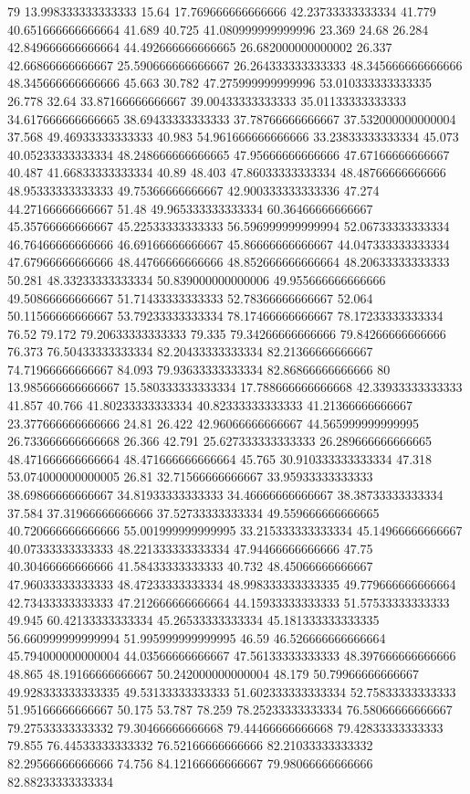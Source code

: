 79 13.998333333333333 15.64 17.769666666666666 42.23733333333334 41.779 40.651666666666664 41.689 40.725 41.080999999999996 23.369 24.68 26.284 42.849666666666664 44.492666666666665 26.682000000000002 26.337 42.66866666666667 25.590666666666667 26.264333333333333 48.345666666666666 48.345666666666666 45.663 30.782 47.275999999999996 53.010333333333335 26.778 32.64 33.87166666666667 39.00433333333333 35.01133333333333 34.617666666666665 38.69433333333333 37.78766666666667 37.532000000000004 37.568 49.46933333333333 40.983 54.961666666666666 33.23833333333334 45.073 40.05233333333334 48.248666666666665 47.95666666666666 47.67166666666667 40.487 41.66833333333334 40.89 48.403 47.86033333333334 48.48766666666666 48.95333333333333 49.75366666666667 42.900333333333336 47.274 44.27166666666667 51.48 49.965333333333334 60.36466666666667 45.35766666666667 45.22533333333333 56.596999999999994 52.06733333333334 46.76466666666666 46.69166666666667 45.86666666666667 44.047333333333334 47.67966666666666 48.44766666666666 48.852666666666664 48.20633333333333 50.281 48.33233333333334 50.839000000000006 49.955666666666666 49.50866666666667 51.71433333333333 52.78366666666667 52.064 50.11566666666667 53.79233333333334 78.17466666666667 78.17233333333334 76.52 79.172 79.20633333333333 79.335 79.34266666666666 79.84266666666666 76.373 76.50433333333334 82.20433333333334 82.21366666666667 74.71966666666667 84.093 79.93633333333334 82.86866666666666
80 13.985666666666667 15.580333333333334 17.788666666666668 42.33933333333333 41.857 40.766 41.80233333333334 40.82333333333333 41.21366666666667 23.377666666666666 24.81 26.422 42.96066666666667 44.565999999999995 26.733666666666668 26.366 42.791 25.627333333333333 26.289666666666665 48.471666666666664 48.471666666666664 45.765 30.910333333333334 47.318 53.074000000000005 26.81 32.71566666666667 33.95933333333333 38.69866666666667 34.81933333333333 34.46666666666667 38.38733333333334 37.584 37.31966666666666 37.52733333333334 49.559666666666665 40.720666666666666 55.001999999999995 33.215333333333334 45.14966666666667 40.07333333333333 48.221333333333334 47.94466666666666 47.75 40.30466666666666 41.58433333333333 40.732 48.45066666666667 47.96033333333333 48.47233333333334 48.998333333333335 49.779666666666664 42.73433333333333 47.212666666666664 44.15933333333333 51.57533333333333 49.945 60.42133333333334 45.26533333333334 45.181333333333335 56.660999999999994 51.995999999999995 46.59 46.526666666666664 45.794000000000004 44.03566666666667 47.56133333333333 48.397666666666666 48.865 48.19166666666667 50.242000000000004 48.179 50.79966666666667 49.928333333333335 49.53133333333333 51.602333333333334 52.75833333333333 51.95166666666667 50.175 53.787 78.259 78.25233333333334 76.58066666666667 79.27533333333332 79.30466666666668 79.44466666666668 79.42833333333333 79.855 76.44533333333332 76.52166666666666 82.21033333333332 82.29566666666666 74.756 84.12166666666667 79.98066666666666 82.88233333333334
